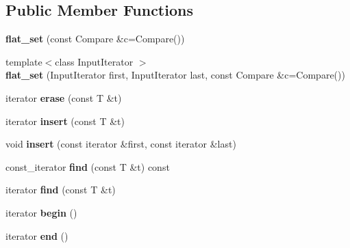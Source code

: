 \subsection*{Public Member Functions}
\begin{DoxyCompactItemize}
\item 
\hypertarget{classflat__set_a142169ea5c7b6b049370394cfed3fe65}{{\bfseries flat\+\_\+set} (const Compare \&c=Compare())}\label{classflat__set_a142169ea5c7b6b049370394cfed3fe65}

\item 
\hypertarget{classflat__set_ad3f86af87854578d171995c723ffbc14}{{\footnotesize template$<$class Input\+Iterator $>$ }\\{\bfseries flat\+\_\+set} (Input\+Iterator first, Input\+Iterator last, const Compare \&c=Compare())}\label{classflat__set_ad3f86af87854578d171995c723ffbc14}

\item 
\hypertarget{classflat__set_ae5ca211c594636479b3c0d2ffcd24a56}{iterator {\bfseries erase} (const T \&t)}\label{classflat__set_ae5ca211c594636479b3c0d2ffcd24a56}

\item 
\hypertarget{classflat__set_afe5aa132ec1d9ac7fb3fa9b95e367bae}{iterator {\bfseries insert} (const T \&t)}\label{classflat__set_afe5aa132ec1d9ac7fb3fa9b95e367bae}

\item 
\hypertarget{classflat__set_a086669072cb6717f2b221803d4f22eb0}{void {\bfseries insert} (const iterator \&first, const iterator \&last)}\label{classflat__set_a086669072cb6717f2b221803d4f22eb0}

\item 
\hypertarget{classflat__set_a46c3cf5c64ff20392c0a2d2781f007b8}{const\+\_\+iterator {\bfseries find} (const T \&t) const }\label{classflat__set_a46c3cf5c64ff20392c0a2d2781f007b8}

\item 
\hypertarget{classflat__set_a368e5bc9b1b3a0f819c75919af9c64c7}{iterator {\bfseries find} (const T \&t)}\label{classflat__set_a368e5bc9b1b3a0f819c75919af9c64c7}

\item 
\hypertarget{classflat__set_a439bcd47ee6d8e3219094071519be91a}{iterator {\bfseries begin} ()}\label{classflat__set_a439bcd47ee6d8e3219094071519be91a}

\item 
\hypertarget{classflat__set_a92caeed16ea8d949a1ff7ba55854333f}{iterator {\bfseries end} ()}\label{classflat__set_a92caeed16ea8d949a1ff7ba55854333f}


\end{DoxyCompactItemize}

